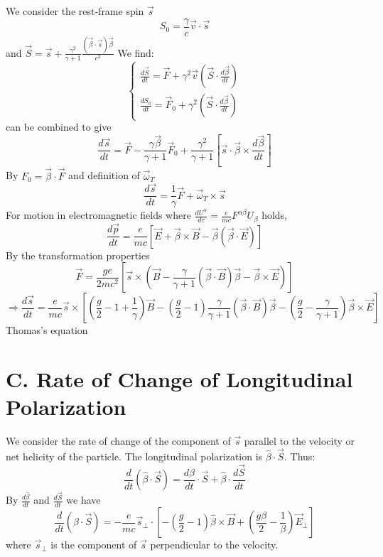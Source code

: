 \documentclass{article}
\begin{document}
	We consider the rest-frame spin $\vec{s}$
	\[
	S_0 = \frac{\gamma}{c} \vec{v} \cdot \vec{s}
	\]
	and $\vec{S} = \vec{s} + \frac{\gamma^2}{\gamma+1} \frac{(\vec{\beta} \cdot \vec{s})\vec{\beta}}{c^2}$
	We find:
	\[
	\begin{cases}
		\frac{d\vec{S}}{dt} = \vec{F} + \gamma^2 \vec{v} (\vec{S} \cdot \frac{d\vec{\beta}}{dt}) \\
		\frac{dS_0}{dt} = \vec{F}_0 + \gamma^2 (\vec{S} \cdot \frac{d\vec{\beta}}{dt})
	\end{cases}
	\]
	can be combined to give
	\[
	\frac{d\vec{s}}{dt} = \vec{F} - \frac{\gamma \vec{\beta}}{\gamma+1} \vec{F}_0 + \frac{\gamma^2}{\gamma+1} \left[ \vec{s} \cdot \vec{\beta} \times \frac{d\vec{\beta}}{dt} \right]
	\]
	By $F_0 = \vec{\beta} \cdot \vec{F}$ and definition of $\vec{\omega}_T$
	\[
	\frac{d\vec{s}}{dt} = \frac{1}{\gamma} \vec{F} + \vec{\omega}_T \times \vec{s}
	\]
	For motion in electromagnetic fields where $\frac{dU^\alpha}{d\tau} = \frac{e}{mc}F^{\alpha\beta}U_\beta$ holds,
	\[
	\frac{d\vec{p}}{dt} = \frac{e}{mc} \left[ \vec{E} + \vec{\beta} \times \vec{B} - \vec{\beta}(\vec{\beta} \cdot \vec{E}) \right]
	\]
	By the transformation properties
	\[
	\vec{F} = \frac{ge}{2mc^2} \left[ \vec{s} \times \left( \vec{B} - \frac{\gamma}{\gamma+1} (\vec{\beta} \cdot \vec{B})\vec{\beta} - \vec{\beta} \times \vec{E} \right) \right]
	\]
	\[
	\Rightarrow \frac{d\vec{s}}{dt} = \frac{e}{mc} \vec{s} \times \left[ \left(\frac{g}{2}-1+\frac{1}{\gamma}\right)\vec{B} - \left(\frac{g}{2}-1\right)\frac{\gamma}{\gamma+1}(\vec{\beta} \cdot \vec{B})\vec{\beta} - \left(\frac{g}{2}-\frac{\gamma}{\gamma+1}\right)\vec{\beta} \times \vec{E} \right]
	\]
	Thomas's equation
	
	\section*{C. Rate of Change of Longitudinal Polarization}
	
	We consider the rate of change of the component of $\vec{s}$ parallel to the velocity or net helicity of the particle.
	The longitudinal polarization is $\hat{\beta} \cdot \vec{S}$.
	Thus:
	\[
	\frac{d}{dt}(\hat{\beta} \cdot \vec{S}) = \frac{d\hat{\beta}}{dt} \cdot \vec{S} + \hat{\beta} \cdot \frac{d\vec{S}}{dt}
	\]
	By $\frac{d\hat{\beta}}{dt}$ and $\frac{d\vec{S}}{dt}$ we have
	\[
	\frac{d}{dt}(\hat{\beta} \cdot \vec{S}) = -\frac{e}{mc} \vec{s}_\perp \cdot \left[ -\left(\frac{g}{2}-1\right)\hat{\beta} \times \vec{B} + \left(\frac{g\beta}{2}-\frac{1}{\beta}\right)\vec{E}_\perp \right]
	\]
	where $\vec{s}_\perp$ is the component of $\vec{s}$ perpendicular to the velocity.
	
\end{document}
